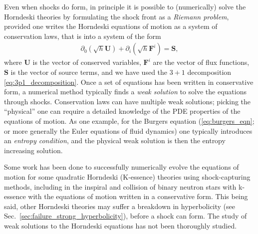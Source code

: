 \documentclass{ws-ijmpd}
\begin{document}
Even when shocks do form,
in principle it is possible to (numerically) 
solve the Horndeski theories by formulating the shock front as a 
\emph{Riemann problem}\cite{2013numerical,rezzolla2013relativistic}, 
provided one writes the Horndeski equations of motion 
as a system of conservation laws, that is into a system 
of the form\cite{rezzolla2013relativistic}
\begin{align}
   \partial_0\left(\sqrt{h}\textbf{U}\right)
   +
   \partial_i\left(\sqrt{h}\textbf{F}^i\right)
   =
   \textbf{S}
   ,
\end{align}
where $\textbf{U}$ is the vector of conserved variables, $\textbf{F}^i$
are the vector of flux functions, $\textbf{S}$ is the vector of
source terms, and
we have used the $3+1$ decomposition \eqref{eq:3p1_decomposition}.
Once a set of equations has been written in conservative form,
a numerical method typically finds a \emph{weak solution} to solve
the equations through shocks.
Conservation laws can have multiple weak solutions; picking the ``physical''
one can require a detailed knowledge of the PDE properties
of the equations of motion. As one example, for the Burgers
equation (\eqref{eq:burgers_eqn}; or more generally the Euler
equations of fluid dynamics) one typically introduces an
\emph{entropy condition}, and the physical weak solution is then
the entropy increasing solution\cite{2013numerical}.

Some work has been done to successfully numerically evolve the 
equations of motion for some quadratic Horndeski (K-essence) theories 
using shock-capturing methods, including in the inspiral
and collision of binary neutron stars with k-essence with the
equations of motion written in a conservative form\cite{Bezares:2020wkn,
terHaar:2020xxb,Bezares:2021yek,Bezares:2021dma}.
This being said, other Horndeski theories may suffer a breakdown
in hyperbolicity 
(see Sec.~\ref{sec:failure_strong_hyperbolicity}),
before a shock can form.
The study of weak solutions to the Horndeski equations has not been
thoroughly studied.

\end{document}
